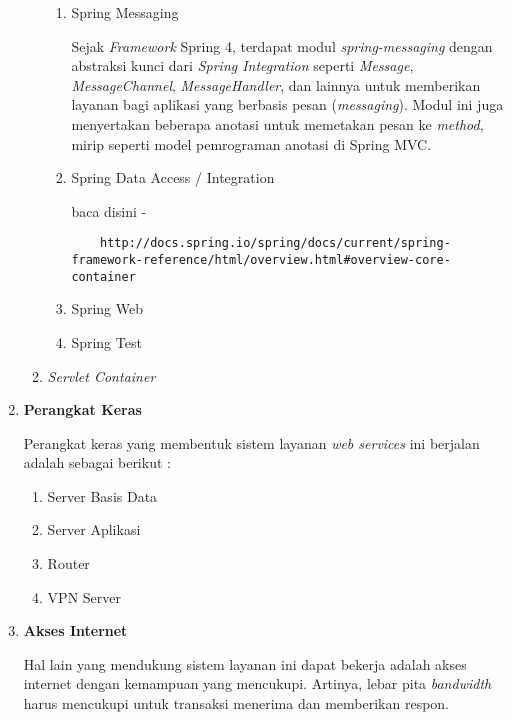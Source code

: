 \documentclass[pdftex,12pt, oneside]{article}
\begin{document}
\begin{enumerate}
\begin{enumerate}
\begin{enumerate}[1)]
    \item Spring Messaging    
    
    Sejak \textit{Framework} Spring 4, terdapat modul \textit{spring-messaging} dengan abstraksi kunci dari \textit{Spring Integration} seperti \textit{Message}, \textit{MessageChannel}, \textit{MessageHandler}, dan lainnya untuk memberikan layanan bagi aplikasi yang berbasis pesan (\textit{messaging}). Modul ini juga menyertakan beberapa anotasi untuk memetakan pesan ke \textit{method}, mirip seperti model pemrograman anotasi di Spring MVC.
    
    
    \item Spring Data Access / Integration
    
    baca disini -
    \begin{verbatim}
    http://docs.spring.io/spring/docs/current/spring-framework-reference/html/overview.html#overview-core-container
    \end{verbatim}
    
    \item Spring Web
    
    
    \item Spring Test
    
    
  \end{enumerate}
  
  \item \textit{Servlet Container}
\end{enumerate}

\item \textbf{Perangkat Keras}

Perangkat keras yang membentuk sistem layanan \textit{web services} ini berjalan adalah sebagai berikut :

\begin{enumerate}
  \item Server Basis Data
  \item Server Aplikasi
  \item Router
  \item VPN Server
\end{enumerate}

\item \textbf{Akses Internet}

Hal lain yang mendukung sistem layanan ini dapat bekerja adalah akses internet dengan kemampuan yang mencukupi. Artinya, lebar pita \textit{bandwidth} harus mencukupi untuk transaksi menerima dan memberikan respon.


\end{enumerate}
\end{document}
